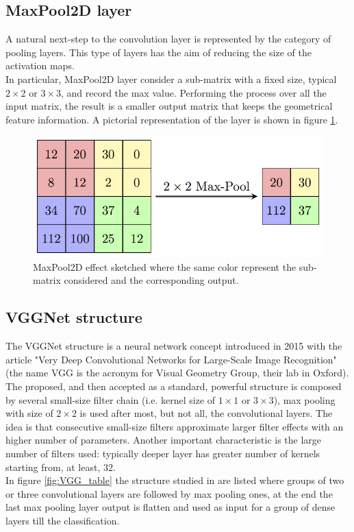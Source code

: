 \subsection*{MaxPool2D layer}
A natural next-step to the convolution layer is represented by the category of pooling layers. This type of layers has the aim of reducing the size of the activation maps.\\
In particular, MaxPool2D layer consider a sub-matrix with a fixed size, typical $2\times2$ or $3\times3$, and record the max value. Performing the process over all the input matrix, the result is a smaller output matrix that keeps the geometrical feature information. A pictorial representation of the layer is shown in figure \ref{fig:MaxPool}.

\begin{figure}[b]
	\centering
	\includegraphics[width=.6\textwidth]{IMG/Cap6/MaxpoolSample2.png}
	\caption{MaxPool2D effect sketched where the same color represent the sub-matrix considered and the corresponding output.}
	\label{fig:MaxPool}
\end{figure}



\subsection*{VGGNet structure}
The VGGNet structure is a neural network concept introduced in 2015 with the article "Very Deep Convolutional Networks for Large-Scale Image Recognition" \cite{VGGArt} (the name VGG is the acronym for Visual Geometry Group, their lab in Oxford).\\
The proposed, and then accepted as a standard, powerful structure is composed by several small-size filter chain (i.e. kernel size of $1\times1$ or $3\times3$), max pooling with size of $2\times2$ is used after most, but not all, the convolutional layers. The idea is that consecutive small-size filters approximate larger filter effects with an higher number of parameters. Another important characteristic is the large number of filters used: typically deeper layer has greater number of kernels starting from, at least, $32$.\\
In figure \ref{fig:VGG_table} the structure studied in \cite{VGGArt} are listed where groups of two or three convolutional layers are followed by max pooling ones, at the end the last max pooling layer output is flatten and used as input for a group of dense layers till the classification.\\


